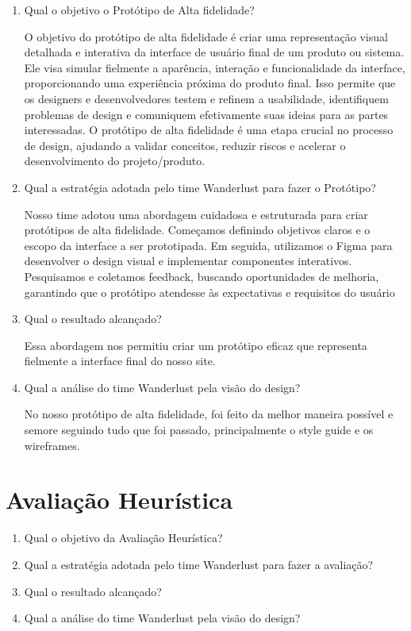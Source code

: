 \documentclass{article}
\begin{document}
\begin{enumerate}
      \item Qual o objetivo o Protótipo de Alta fidelidade?

            O objetivo do protótipo de alta fidelidade é criar uma representação visual detalhada e interativa da interface de usuário final de um produto ou sistema. Ele visa simular fielmente a aparência, interação e funcionalidade da interface, proporcionando uma experiência próxima do produto final. Isso permite que os designers e desenvolvedores testem e refinem a usabilidade, identifiquem problemas de design e comuniquem efetivamente suas ideias para as partes interessadas. O protótipo de alta fidelidade é uma etapa crucial no processo de design, ajudando a validar conceitos, reduzir riscos e acelerar o desenvolvimento do projeto/produto.

      \item Qual a estratégia adotada pelo time Wanderlust para fazer o Protótipo?

            Nosso time adotou uma abordagem cuidadosa e estruturada para criar protótipos de alta fidelidade. Começamos definindo objetivos claros e o escopo da interface a ser prototipada. Em seguida, utilizamos o Figma para desenvolver o design visual e implementar componentes interativos. Pesquisamos e coletamos feedback, buscando oportunidades de melhoria, garantindo que o protótipo atendesse às expectativas e requisitos do usuário

      \item Qual o resultado alcançado?

            Essa abordagem nos permitiu criar um protótipo eficaz que representa fielmente a interface final do nosso site.

      \item Qual a análise do time Wanderlust pela visão do design?

            No nosso protótipo de alta fidelidade, foi feito da melhor maneira possível e semore seguindo tudo que foi passado, principalmente o style guide e os wireframes.

\end{enumerate}

\section{Avaliação Heurística}

\begin{enumerate}
      \item Qual o objetivo da Avaliação Heurística?



      \item Qual a estratégia adotada pelo time Wanderlust para fazer a avaliação?



      \item Qual o resultado alcançado?



      \item Qual a análise do time Wanderlust pela visão do design?



\end{enumerate}
\end{document}

